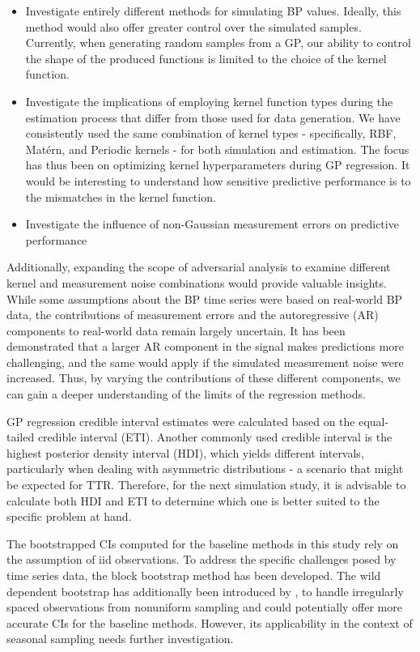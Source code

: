 \begin{itemize}
    \item Investigate entirely different methods for simulating BP values.
    Ideally, this method would also offer greater control over the simulated samples.
    Currently, when generating random samples from a GP, our ability to control the shape of the produced
    functions is limited to the choice of the kernel function.
    \item Investigate the implications of employing kernel function types
    during the estimation process that differ from those used for data generation.
    We have consistently used the same combination of kernel types - specifically, RBF, Matérn, and Periodic kernels -
    for both simulation and estimation.
    The focus has thus been on optimizing kernel hyperparameters during GP regression.
    It would be interesting to understand how sensitive predictive performance is to the mismatches in
    the kernel function.
    \item Investigate the influence
    of non-Gaussian measurement errors on predictive performance
\end{itemize}

Additionally, expanding the scope of adversarial analysis to examine different
kernel and measurement noise combinations would provide valuable insights.
While some assumptions about the BP time series were based on real-world BP data,
the contributions of measurement errors and the autoregressive (AR) components
to real-world data remain largely uncertain.
It has been demonstrated that a larger AR component in the signal makes predictions
more challenging, and the same would apply if the simulated measurement noise were increased.
Thus, by varying the contributions of these different components,
we can gain a deeper understanding of the limits of the regression methods.

GP regression credible interval estimates were calculated based on the equal-tailed
credible interval (ETI). Another commonly used credible interval is
the highest posterior density interval (HDI), which yields different intervals,
particularly when dealing with asymmetric distributions - a scenario that might be expected for TTR.
Therefore, for the next simulation study, it is advisable to calculate both HDI and ETI
to determine which one is better suited to the specific problem at hand.

The bootstrapped CIs computed for the baseline methods in this study rely on
the assumption of iid observations.
To address the specific challenges
posed by time series data, the block bootstrap method has been developed.
The wild dependent
bootstrap has additionally been introduced by \citeauthor{shao_dependent_2010},
to handle irregularly spaced observations from nonuniform sampling
and could potentially offer
more accurate CIs for the baseline methods.
However, its applicability in the context of seasonal sampling needs
further investigation.

